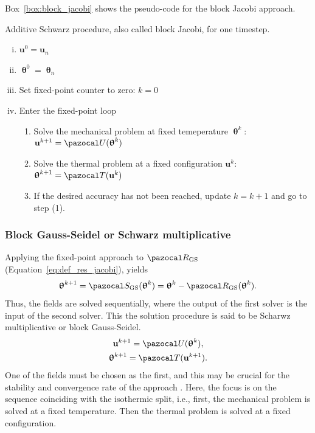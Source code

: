 Box~\ref{box:block_jacobi} shows the pseudo-code for the block Jacobi approach.

\begin{framedbox}[htb]
  \caption{Additive Schwarz procedure, also called block Jacobi, for one timestep.}
  \label{box:block_jacobi}
  \begin{center}
    \begin{minipage}{0.9\textwidth}
    \begin{enumerate}[(i)]
    \item \(\mathbf u^0 = \mathbf u_{n}\)
    \item \(\bm \uptheta^0 = \bm \uptheta_n\)
    \item Set fixed-point counter to zero: \(k=0\)
    \item Enter the fixed-point loop
    \begin{enumerate}[(1)]
      \item Solve the mechanical problem at fixed temeperature \(\bm \uptheta^k\): \(\mathbf u^{k+1} = \pazocal U(\bm \uptheta^k)\)
      \item Solve the thermal problem at a fixed configuration \(\mathbf u^k\): \(\bm \uptheta^{k+1} = \pazocal T(\mathbf u^k)\)
      \item If the desired accuracy has not been reached, update \(k=k+1\) and go to step (1).

    \end{enumerate}
    \end{enumerate}
    \end{minipage}
  \end{center}
\end{framedbox}

\subsubsection{Block Gauss-Seidel or Schwarz multiplicative}

Applying the fixed-point approach to \(\pazocal R_\mathrm{GS}\) (Equation~\eqref{eq:def_res_jacobi}), yields
\begin{equation}
  \bm\uptheta^{k+1} = \pazocal S_\mathrm{GS}(\bm\uptheta^k) =  \bm\uptheta^k - \pazocal R_\mathrm{GS}(\bm \uptheta^k).
\end{equation}
Thus, the fields are solved sequentially, where the output of the first solver is the input of the second solver.
This the solution procedure is said to be Scharwz multiplicative or block Gauss-Seidel.
\begin{gather}
\mathbf u^{k+1}  = \pazocal U(\bm \uptheta^k),\\
\bm \uptheta^{k+1} = \pazocal T(\mathbf u^{k+1}).
\end{gather}
One of the fields must be chosen as the first, and this may be crucial for the stability and convergence rate of the approach \citep{joosten_analysis_2009}.
Here, the focus is on the sequence coinciding with the isothermic split, i.e., first, the mechanical problem is solved at a fixed temperature.
Then the thermal problem is solved at a fixed configuration.

